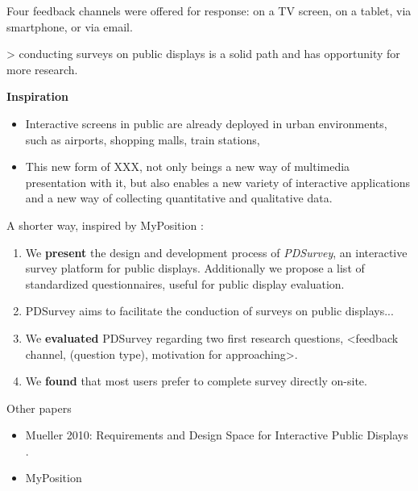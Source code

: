 	Four feedback channels were offered for response: on a TV screen, on a tablet, via smartphone, or via email.

	> conducting surveys on public displays is a solid path and has opportunity for more research.




\textbf{Inspiration}

	\begin{itemize}
	\item Interactive screens in public are already deployed in urban environments, such as airports, shopping malls, train stations, 
	\item This new form of XXX, not only beings a new way of multimedia presentation with it, but also enables a new variety of interactive applications and a new way of collecting quantitative and qualitative data.
	\end{itemize}

	A shorter way, inspired by MyPosition \cite{valkanova2014myposition}:
	\begin{enumerate}
	\item We \textbf{present} the design and development process of \textit{PDSurvey}, an interactive survey platform for public displays. Additionally we propose a list of standardized questionnaires, useful for public display evaluation.
	\item PDSurvey aims to facilitate the conduction of surveys on public displays...
	\item We \textbf{evaluated} PDSurvey regarding two first research questions, <feedback channel, (question type), motivation for approaching>.
	\item We \textbf{found} that most users prefer to complete survey directly on-site.
	\end{enumerate}

	Other papers
	\begin{itemize}
	\item Mueller 2010: Requirements and Design Space for Interactive Public Displays \cite{muller2010requirements}.
	\item MyPosition \cite{valkanova2014myposition}
	\end{itemize}